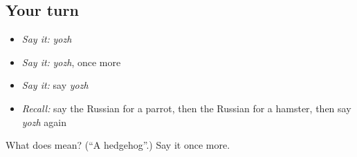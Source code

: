 \subsection*{Your turn}
\begin{itemize}
\raggedright
  \item \emph{Say it:} \emph{yozh}
  \item \emph{Say it:} \emph{yozh}, once more
  \item \emph{Say it:} say \emph{yozh}
  \item \emph{Recall:} say the Russian for a parrot, then the Russian for a hamster, then say \emph{yozh} again
\end{itemize}

\begin{tcolorbox}[breakable,colback=teal!4,colframe=teal!35!black,title={Before you move on}]
What does  mean? (\textquotedblleft{}A hedgehog\textquotedblright{}.) Say it once more.
\end{tcolorbox}

